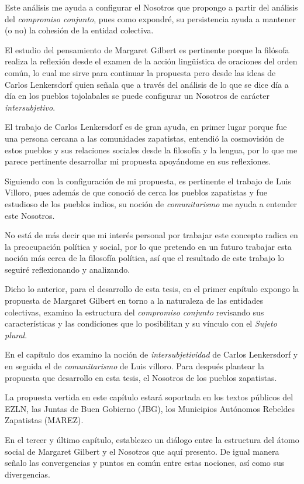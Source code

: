 \documentclass[oneside]{book}
\begin{document}
Este análisis me ayuda a configurar el Nosotros que propongo a partir del análisis del \textit{compromiso conjunto}, pues como expondré, su persistencia ayuda a mantener (o no) la cohesión de la entidad colectiva.

El estudio del pensamiento de Margaret Gilbert es pertinente porque la filósofa realiza la reflexión desde el examen de la acción lingüística de oraciones del orden común, lo cual me sirve para continuar la propuesta pero desde las ideas de Carlos Lenkersdorf quien señala que a través del análisis de lo que se dice día a día en los pueblos tojolabales se puede configurar un Nosotros de carácter  \textit{intersubjetivo}.

El trabajo de Carlos Lenkersdorf es de gran ayuda, en primer lugar porque fue una persona cercana a las comunidades zapatistas, entendió la cosmovisión de estos pueblos y sus relaciones sociales desde la filosofía y la lengua, por lo que me parece pertinente desarrollar mi propuesta apoyándome en sus reflexiones. 

Siguiendo con la configuración de mi propuesta, es pertinente el trabajo de Luis Villoro, pues además de que conoció de cerca los pueblos zapatistas y fue estudioso de los pueblos indios, su noción de \textit{comunitarismo} me ayuda a entender este Nosotros.


No está de más decir que mi interés personal por trabajar este concepto radica en la preocupación política y social, por lo que pretendo en un futuro trabajar esta noción más cerca de la filosofía política, así que el resultado de este trabajo lo seguiré reflexionando y analizando.

Dicho lo anterior, para el desarrollo de esta tesis, en el primer capítulo expongo la propuesta de Margaret Gilbert en torno a la naturaleza de las entidades colectivas, examino la estructura del \textit{compromiso conjunto} revisando sus características y las condiciones que lo posibilitan y su vínculo con el \textit{Sujeto plural}.

En el capítulo dos examino la noción de \textit{intersubjetividad} de Carlos Lenkersdorf y en seguida el de \textit{comunitarismo} de Luis villoro. Para después plantear la propuesta que desarrollo en esta tesis, el Nosotros de los pueblos zapatistas.

La propuesta vertida en este capítulo estará soportada en los textos públicos del EZLN, las Juntas de Buen Gobierno (JBG), los Municipios Autónomos Rebeldes Zapatistas (MAREZ). 
	
En el tercer y último capítulo, establezco un diálogo entre la estructura del átomo social de Margaret Gilbert y el Nosotros que aquí presento. De igual manera señalo las convergencias y puntos en común entre estas nociones, así como sus divergencias.
\end{document}
